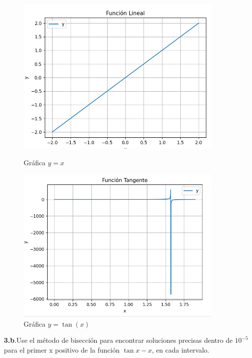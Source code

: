 \documentclass[12pt]{article}
\begin{document}
\begin{figure}[H]
    \centering
    \begin{minipage}{0.5\textwidth}
        \centering
        \includegraphics[width=0.9\textwidth]{./inFiles/Figures/Cap1.png}
        \caption{Gráfica \( y = x \)}
    \end{minipage}%
    \begin{minipage}{0.5\textwidth}
        \centering
        \includegraphics[width=0.9\textwidth]{./inFiles/Figures/Cap4.png}
        \caption{Gráfica \( y = \tan(x) \)}
    \end{minipage}
\end{figure}

\textbf{3.b}.Use el método de bisección para encontrar soluciones precisas dentro de $10^{-5}$ para el primer x positivo de la función $\tan x - x$, en cada intervalo.
\end{document}

